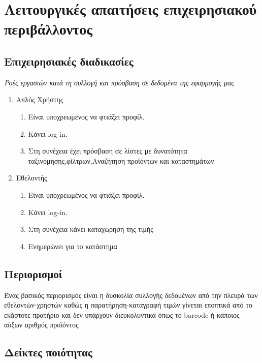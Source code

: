 \section{Λειτουργικές απαιτήσεις επιχειρησιακού περιβάλλοντος}



\subsection{Επιχειρησιακές διαδικασίες}
\textit{Ροές εργασιών κατά τη συλλογή και πρόσβαση σε δεδομένα της εφαρμογής μας}

\begin{enumerate}
	\item Απλός Χρήστης
	\begin{enumerate}
		\item Είναι υποχρεωμένος να φτιάξει προφίλ.
		\item Κάνει log-in.
		\item Στη συνέχεια έχει πρόσβαση σε λίστες με δυνατότητα ταξινόμησης,φίλτρων,Αναζήτηση προϊόντων και καταστημάτων
	\end{enumerate}
	\item Εθελοντής 
	\begin{enumerate}
		\item Είναι υποχρεωμένος να φτιάξει προφίλ.
		\item Κάνει log-in.
		\item Στη συνέχεια κάνει καταχώρηση της τιμής
		\item Ενημερώνει για το κατάστημα
	\end{enumerate}
	
\end{enumerate}

\subsection{Περιορισμοί}
Ένας βασικός περιορισμός είναι η δυσκολία συλλογής δεδομένων από την πλευρά των εθελοντών-χρηστών καθώς η παρατήρηση-καταγραφή τιμών γίνεται εποπτικά από το εκάστοτε πρατήριο και δεν υπάρχουν διευκολυντικά όπως το barcode ή κάποιος αύξων αριθμός προϊόντος


\subsection{Δείκτες ποιότητας}

